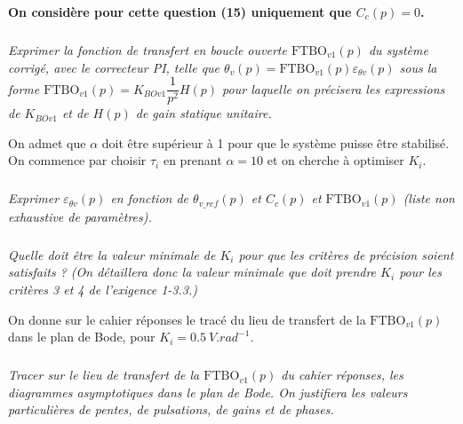 \documentclass[10pt,fleqn]{article} %
\begin{document}
\textbf{On considère pour cette question (15) uniquement que $C_c(p)=0$.}
\subparagraph{}
\textit{Exprimer la fonction de transfert en boucle ouverte $\text{FTBO}_{v1}(p)$ du système corrigé, avec le
correcteur PI, telle que $\theta_v(p)=\text{FTBO}_{v1}(p) \varepsilon_{\theta v}(p)$ sous la forme
$\text{FTBO}_{v1}(p)=K_{BOv1}\dfrac{1}{p^2}H(p)$ pour laquelle on précisera les expressions de $K_{BOv1}$ et de $H(p)$ de gain statique unitaire.}


\ifprof
\begin{corrige}
\end{corrige}
\else
\fi
\vspace{.25cm}

On admet que $\alpha$ doit être supérieur à 1 pour que le système puisse être stabilisé. On commence par choisir $\tau_i$ en prenant $\alpha=10$ et on cherche à optimiser $K_i$.

\subparagraph{}
\textit{Exprimer $\varepsilon_{\theta v}(p)$ en fonction de $\theta_{v\_ref}(p)$ et $C_c(p)$ et $\text{FTBO}_{v1}(p)$ (liste non exhaustive de paramètres).}

\ifprof
\begin{corrige}
\end{corrige}
\else
\fi


\subparagraph{}
\textit{Quelle doit être la valeur minimale de $K_i$ pour que les critères de précision soient satisfaits ? (On détaillera donc la valeur minimale que doit prendre $K_i$ pour les critères 3 et 4 de l'exigence 1-3.3.)}
\ifprof
\begin{corrige}
\end{corrige}
\else
\fi

On donne sur le cahier réponses le tracé du lieu de transfert de la $\text{FTBO}_{v1}(p)$ dans le plan de Bode,
pour $K_i = \SI{0,5}{V.rad^{-1}}$.


\subparagraph{}
\textit{Tracer sur le lieu de transfert de la $\text{FTBO}_{v1}(p)$ du cahier réponses, les diagrammes asymptotiques
dans le plan de Bode. On justifiera les valeurs particulières de pentes, de pulsations,
de gains et de phases.}
\ifprof
\begin{corrige}
\end{corrige}
\else
\fi
\end{document}
